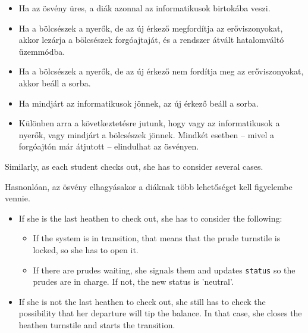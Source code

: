 \documentclass{book}
\begin{document}
\begin{itemize}

\item Ha az ösvény üres, a diák azonnal az informatikusok birtokába veszi.

\item Ha a bölcsészek a nyerők, de az új érkező megfordítja az erőviszonyokat,
akkor lezárja a bölcsészek forgóajtaját, és a rendszer átvált
hatalomváltó üzemmódba.

\item Ha a bölcsészek a nyerők, de az új érkező nem fordítja meg az erőviszonyokat,
akkor beáll a sorba.

\item Ha mindjárt az informatikusok jönnek, az új érkező beáll a sorba.

\item Különben arra a következtetésre jutunk, hogy vagy az informatikusok
a nyerők, vagy mindjárt a bölcsészek jönnek. Mindkét esetben
-- mivel a forgóajtón már átjutott -- elindulhat az ösvényen.

\end{itemize}

Similarly, as each student checks out, she has to consider several
cases.

Hasnonlóan, az ösvény elhagyásakor a diáknak több lehetőséget kell
figyelembe vennie. 

\begin{itemize}

\item If she is the last heathen to check out, she has to
consider the following:

    \begin{itemize}

    \item If the system is in transition, that means that the prude
      turnstile is locked, so she has to open it.

    \item If there are prudes waiting, she signals them and
      updates {\tt status} so the prudes are in charge.  If not, the
      new status is 'neutral'.

    \end{itemize}  

\item If she is not the last heathen to check out, she still has to
check the possibility that her departure will tip the balance.  In
that case, she closes the heathen turnstile and starts the
transition.

\end{itemize}
\end{document}
